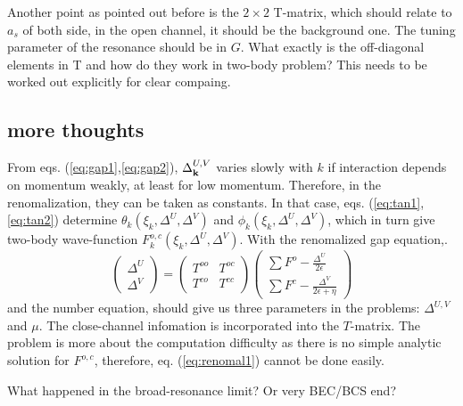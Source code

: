 Another point as pointed out before is  the $2\times2$ T-matrix, which should relate to $a_s$ of both side, in the open channel, it should be the background one.  The tuning parameter of the resonance should be in $G$.  What exactly is the off-diagonal elements in T and how do they work in two-body problem?  This needs to be worked out explicitly for clear compaing.    
\subsection{more thoughts}
From eqs. (\ref{eq:gap1},\ref{eq:gap2}), $\Delta^{U,V}_{\mathbf{k}}$ varies slowly with $k$ if interaction depends on momentum weakly, at least for low momentum.  Therefore, in the renomalization, they can be taken as constants.  In that case, eqs. (\ref{eq:tan1},\ref{eq:tan2}) determine $\theta_k(\xi_k,\Delta^U,\Delta^V)$ and $\phi_k(\xi_k,\Delta^U,\Delta^V)$, which in turn give two-body wave-function $F^{o,c}_k(\xi_k,\Delta^U,\Delta^V)$.  
With the renomalized gap equation,.  
\begin{equation}\label{eq:renomal1}
\begin{pmatrix}\Delta^U\\\Delta^V\end{pmatrix}=\begin{pmatrix}T^{oo}&T^{oc}\\T^{co}&T^{cc}\end{pmatrix}
\begin{pmatrix}\sum{F^o-\frac{\Delta^U}{2\epsilon}}\\\sum{F^c-\frac{\Delta^V}{2\epsilon+\eta}}\end{pmatrix}
\end{equation}
and the number equation, should give us three parameters in the problems: $\Delta^{U,V}$ and $\mu$.  The close-channel infomation is incorporated into the $T$-matrix.  The problem is more about the computation difficulty as there is no simple analytic solution for $F^{o,c}$, therefore, eq. (\ref{eq:renomal1}) cannot be done easily.

What happened in the broad-resonance limit? Or very BEC/BCS end? 